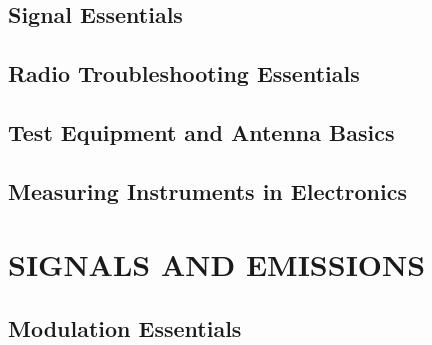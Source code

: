 \documentclass[12pt]{book}
\begin{document}
\section{Signal Essentials}











\section{Radio Troubleshooting Essentials}











\section{Test Equipment and Antenna Basics}











\section{Measuring Instruments in Electronics}










\chapter{SIGNALS AND EMISSIONS}
\section{Modulation Essentials}












\end{document}
